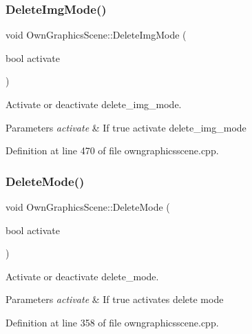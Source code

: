 \mbox{\label{classOwnGraphicsScene_aefe52a5b20dbb38dcc9d9510ecfabe52}} 
\subsubsection{\texorpdfstring{Delete\+Img\+Mode()}{DeleteImgMode()}}
{\footnotesize\ttfamily void Own\+Graphics\+Scene\+::\+Delete\+Img\+Mode (\begin{DoxyParamCaption}\item[{bool}]{activate }\end{DoxyParamCaption})}



Activate or deactivate delete\+\_\+img\+\_\+mode. 


\begin{DoxyParams}{Parameters}
{\em activate} & If true activate delete\+\_\+img\+\_\+mode \\
\hline
\end{DoxyParams}


Definition at line 470 of file owngraphicsscene.\+cpp.

\mbox{\label{classOwnGraphicsScene_aca454942ecf6c472d020e063862464d4}} 
\subsubsection{\texorpdfstring{Delete\+Mode()}{DeleteMode()}}
{\footnotesize\ttfamily void Own\+Graphics\+Scene\+::\+Delete\+Mode (\begin{DoxyParamCaption}\item[{bool}]{activate }\end{DoxyParamCaption})}



Activate or deactivate delete\+\_\+mode. 


\begin{DoxyParams}{Parameters}
{\em activate} & If true activates delete mode \\
\hline
\end{DoxyParams}


Definition at line 358 of file owngraphicsscene.\+cpp.

